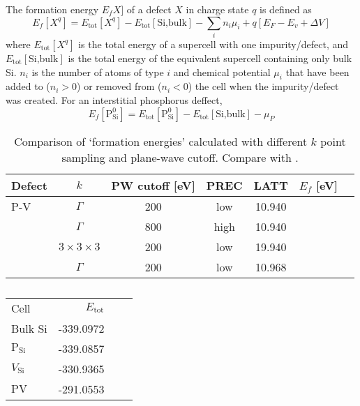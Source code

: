 \documentclass[11pt,bibliography=totoc,index=totoc]{scrbook}   %
\begin{document}
The formation energy $E_fX]$ of a defect $X$ in charge state $q$ is defined as 
\begin{equation}
  E_f[X^q] = E_{\text{tot}}[X^q] - E_{\text{tot}}[\text{Si,bulk}] -  \sum_i n_i \mu_i + q [ E_F - E_v + \Delta V ]
\end{equation}
where $E_{\text{tot}}[X^q]$ is the total energy of a supercell with one impurity/defect,
and $E_{\text{tot}}[\text{Si,bulk}]$ is the total energy of the equivalent supercell containing only bulk Si. 
$n_i$ is the number of atoms of type $i$ and chemical potential $\mu_i$ that have been added to ($n_i>0$) or removed from ($n_i<0$) the cell when the impurity/defect was created. For an interstitial phosphorus deffect,
\begin{equation}
  E_f[\text{P}_{\text{Si}}^0] = E_{\text{tot}}[\text{P}_{\text{Si}}^0] - E_{\text{tot}}[\text{Si,bulk}] - \mu_P
\end{equation}


\begin{table}[htbp]
  \centering
  \begin{tabular}{lcccccc}\toprule
    Defect  & $k$                   & PW cutoff [eV]    & PREC  & LATT      & $E_f$ [eV]    \\\midrule
    P-V     & $\Gamma$              & 200               & low   & 10.940    &               \\
            & $\Gamma$              & 800               & high  & 10.940    &               \\
            & $3\times 3\times 3$   & 200               & low   & 19.940    &               \\
            & $\Gamma$              & 200               & low   & 10.968    &               \\\bottomrule
  \end{tabular}
  \caption{Comparison of `formation energies' calculated with different $k$ point sampling and 
  plane-wave cutoff. Compare with \cite[p. 3]{Sahli:2009}.}
\end{table}

\begin{table}[htbp]
  \centering
  \begin{tabular}{lrrr}
    Cell                        & $E_{\text{tot}}$  \\ 
    Bulk Si                     & -339.0972         \\
    $\text{P}_{\text{Si}}$      & -339.0857         \\
    $V_{\text{Si}}$             & -330.9365         \\
    $\text{PV}$                 & -291.0553         \\
  \end{tabular}
  \caption{}
\end{table}
\end{document}
